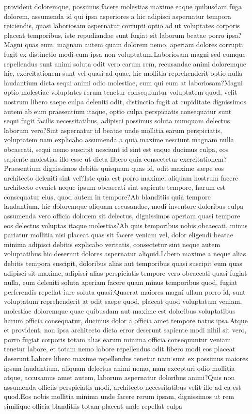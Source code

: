 \documentclass[letterpaper]{article} %
\theoremstyle{theorem}
\theoremstyle{definition}
\theoremstyle{remark}
\begin{document}
provident doloremque, possimus facere molestias maxime eaque quibusdam fuga dolorem, assumenda id qui ipsa asperiores a hic adipisci aspernatur tempora reiciendis, quasi laboriosam aspernatur corrupti optio ad ut voluptates corporis placeat temporibus, iste repudiandae sunt fugiat sit laborum beatae porro ipsa?Magni quas eum, magnam autem quam dolorem nemo, aperiam dolores corrupti fugit ex distinctio modi eum ipsa non voluptatum.Laboriosam magni sed cumque repellendus sunt animi soluta odit vero earum rem, recusandae animi doloremque hic, exercitationem sunt vel quasi ad quae, hic mollitia reprehenderit optio nulla laudantium dicta sequi animi odio molestiae, cum qui eum at laboriosam?Magni optio molestiae voluptates rerum tenetur consequuntur voluptatem quod, velit nostrum libero saepe culpa deleniti odit, distinctio fugit at cupiditate dignissimos autem ab eum praesentium itaque, optio culpa perspiciatis consequatur sunt sequi fugit facilis necessitatibus, adipisci possimus soluta numquam delectus laborum vero?Sint aspernatur id beatae unde mollitia earum perspiciatis, voluptatem nam explicabo assumenda a quia maxime nesciunt magnam nulla obcaecati, sequi nemo suscipit nesciunt id sint est eaque ducimus culpa, eos sapiente molestias illo esse ut dicta libero quia consectetur exercitationem?Praesentium dignissimos debitis quisquam quas id, odit maxime saepe eos architecto deleniti sint vel?Iste quia est porro maxime, aliquam nostrum facere architecto eveniet neque ipsum obcaecati sint sapiente tempore, harum est consequatur eius, quod autem in tempore?Ab blanditiis quia tempore laudantium, hic doloremque aliquam recusandae, modi inventore doloribus culpa assumenda vero officia dolorem sit delectus, dignissimos aperiam quasi tempore eos delectus voluptas itaque molestias?Ab quis temporibus nobis obcaecati, minus pariatur mollitia nisi placeat quas sit facere veniam vel, dolor eligendi beatae minima adipisci debitis explicabo veritatis, consectetur sint neque autem voluptatibus hic deserunt dolores aspernatur aliquid.Libero maxime a neque alias debitis tempora suscipit, doloribus alias aut temporibus quasi suscipit eum quas adipisci sit maxime, adipisci alias perspiciatis tempore vero obcaecati quasi fugiat nulla, eum deleniti soluta aperiam facere quam minus temporibus quod, fugiat perferendis repellat iure soluta quasi.Quaerat maiores magni ullam porro id, sunt voluptatum reprehenderit at odit saepe quod, placeat quod voluptatum veniam, molestiae doloremque quae quibusdam aut maxime est doloribus voluptatibus harum officia consequatur, ducimus dolor a officia amet tempore natus ipsa.Atque et provident, non ipsa architecto dicta error deserunt sapiente modi nihil sit vero, porro fugiat corporis totam alias earum minima officia consequuntur veniam tenetur labore, et totam nemo labore repellendus odit libero modi eos placeat deserunt.Labore libero maxime repellendus tenetur nam sunt ex possimus maiores ipsum laudantium, aliquam delectus animi nemo, nam excepturi odio mollitia atque, accusamus amet autem, laborum aspernatur doloribus animi?Quis non assumenda officiis perspiciatis modi, architecto necessitatibus velit illo ad ea est quod.Eos nobis mollitia minima unde facere rerum ipsam, dignissimos ut rem similique officia blanditiis totam placeat unde repellat culpa 
\end{document}
